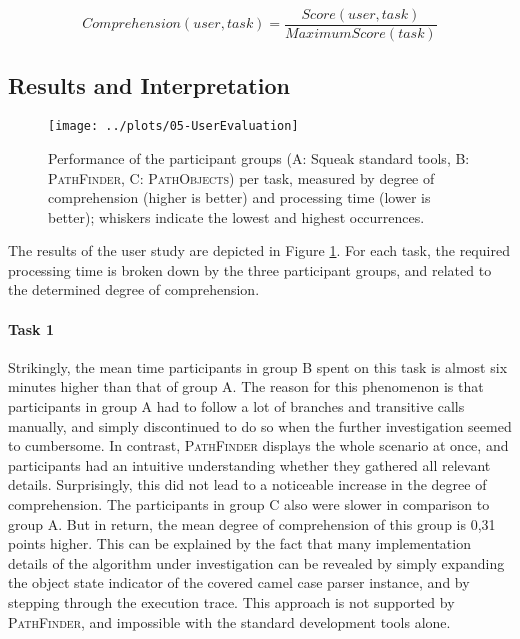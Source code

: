 \begin{equation}
Comprehension(user, task) = \frac{Score(user, task)}{MaximumScore(task)}\label{eq:UserEvaluationDc}
\end{equation}

\subsection{Results and Interpretation}

\begin{figure}[tb!]
	\centering

	\texttt{[image: ../plots/05-UserEvaluation]}
	\caption[Results of the User Study]{Performance of the participant groups (A: Squeak standard tools, B: \textsc{PathFinder}, C: \textsc{PathObjects}) per task, measured by degree of comprehension (higher is better) and processing time (lower is better); whiskers indicate the lowest and highest occurrences.}
	\label{fig:DiscussionStudyResults}
	
\end{figure}

The results of the user study are depicted in Figure \ref{fig:DiscussionStudyResults}.
For each task, the required processing time is broken down by the three participant groups, and related to the determined degree of comprehension.

\paragraph{Task 1} Strikingly, the mean time participants in group B spent on this task is almost six minutes higher than that of group A.
The reason for this phenomenon is that participants in group A had to follow a lot of branches and transitive calls manually, and simply discontinued to do so when the further investigation seemed to cumbersome.
In contrast, \textsc{PathFinder} displays the whole scenario at once, and participants had an intuitive understanding whether they gathered all relevant details.
Surprisingly, this did not lead to a noticeable increase in the degree of comprehension.
The participants in group C also were slower in comparison to group A.
But in return, the mean degree of comprehension of this group is 0,31 points higher.
This can be explained by the fact that many implementation details of the algorithm under investigation can be revealed by simply expanding the object state indicator of the covered camel case parser instance, and by stepping through the execution trace.
This approach is not supported by \textsc{PathFinder}, and impossible with the standard development tools alone.

